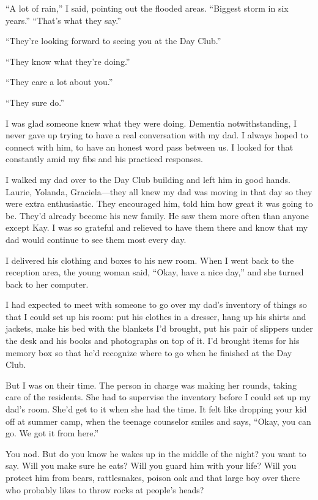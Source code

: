 \documentclass[12pt]{book}
\begin{document}
``A lot of rain,'' I said, pointing out the flooded areas. ``Biggest storm in six years.'' ``That's what they say.''

``They're looking forward to seeing you at the Day Club.''

``They know what they're doing.''

``They care a lot about you.''

``They sure do.''

I was glad someone knew what they were doing. Dementia notwithstanding, I never gave up trying to have a real conversation with my dad. I always hoped to connect with him, to have an honest word pass between us. I looked for that constantly amid my fibs and his practiced responses.

I walked my dad over to the Day Club building and left him in good hands. Laurie, Yolanda, Graciela---they all knew my dad was moving in that day so they were extra enthusiastic. They encouraged him, told him how great it was going to be. They'd already become his new family. He saw them more often than anyone except Kay. I was so grateful and relieved to have them there and know that my dad would continue to see them most every day.

I delivered his clothing and boxes to his new room. When I went back to the reception area, the young woman said, ``Okay, have a nice day,'' and she turned back to her computer.

I had expected to meet with someone to go over my dad's inventory of things so that I could set up his room: put his clothes in a dresser, hang up his shirts and jackets, make his bed with the blankets I'd brought, put his pair of slippers under the desk and his books and photographs on top of it. I'd brought items for his memory box so that he'd recognize where to go when he finished at the Day Club.

But I was on their time. The person in charge was making her rounds, taking care of the residents. She had to supervise the inventory before I could set up my dad's room. She'd get to it when she had the time. It felt like dropping your kid off at summer camp, when the teenage counselor smiles and says, ``Okay, you can go. We got it from here.''

You nod. But do you know he wakes up in the middle of the night? you want to say. Will you make sure he eats? Will you guard him with your life? Will you protect him from bears, rattlesnakes, poison oak and that large boy over there who probably likes to throw rocks at people's heads?
\end{document}
